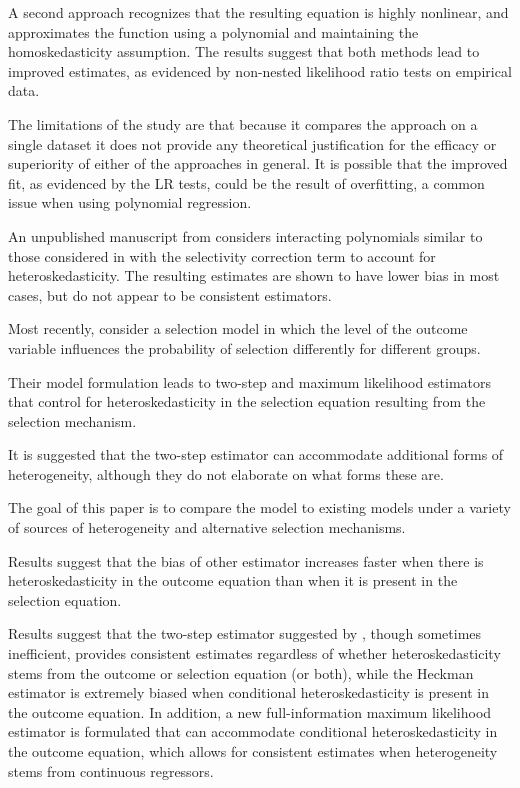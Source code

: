 \documentclass{article}
\begin{document}
A second approach recognizes that the resulting equation is highly nonlinear, and approximates the function using a polynomial and maintaining the homoskedasticity assumption.  The results suggest that both methods lead to improved estimates, as evidenced by non-nested likelihood ratio tests \citep{vuong1989} on empirical data.  

The limitations of the study are that because it compares the approach on a single dataset it does not provide any theoretical justification for the efficacy or superiority of either of the approaches in general.  It is possible that the improved fit, as evidenced by the LR tests, could be the result of overfitting, a common issue when using polynomial regression.   

An unpublished manuscript from \citet{adkins2004} considers interacting polynomials similar to those considered in \citet{schaffner2002} with the selectivity correction term to account for heteroskedasticity.  The resulting estimates are shown to have lower bias in most cases, but do not appear to be consistent estimators.

Most recently, \citet{reichert2014} consider a selection model in which the level of the outcome variable influences the probability of selection differently for different groups.

Their model formulation leads to two-step and maximum likelihood estimators that control for heteroskedasticity in the selection equation resulting from the selection mechanism.

It is suggested that the two-step estimator can accommodate additional forms of heterogeneity, although they do not elaborate on what forms these are.  

The goal of this paper is to compare the \citet{reichert2014} model to existing models under a variety of sources of heterogeneity and alternative selection mechanisms.

Results suggest that the bias of other estimator increases faster when there is heteroskedasticity in the outcome equation than when it is present in the selection equation.

Results suggest that the two-step estimator suggested by \citet{reichert2014}, though sometimes inefficient, provides consistent estimates regardless of whether heteroskedasticity stems from the outcome or selection equation (or both), while the Heckman estimator is extremely biased when conditional heteroskedasticity is present in the outcome equation.  In addition, a new full-information maximum likelihood estimator is formulated that can accommodate conditional heteroskedasticity in the outcome equation, which allows for consistent estimates when heterogeneity stems from continuous regressors.
\end{document}
